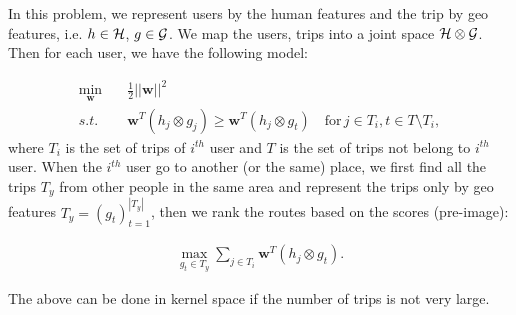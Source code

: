 \documentclass[a4paper,11pt]{article}
\begin{document}
In this problem, we represent users by the human features and the trip by geo features,
i.e. $h \in \cal{H}$, $g \in \cal{G}$. We map the users, trips into a joint space $\cal{H} \otimes
\cal{G}$. Then for each user, we have the following model:

\begin{align}
\min_{\mathbf{w}} &\quad \frac{1}{2} ||\mathbf{w}||^2 \nonumber \\
s.t. &\quad \mathbf{w}^T(h_j \otimes g_j)  \geq \mathbf{w}^T(h_j\otimes g_t) \quad \text{for}\, j \in T_i, t \in T \setminus T_i,
\end{align}
where $T_i$ is the set of trips of $i^{th}$ user and $T$ is the set of trips not belong to $i^{th}$ user. 
When the $i^{th}$ user go to another (or the same) place, we first find all the trips $T_y$ from other 
people in the same area and represent the trips only by geo features $T_y = (g_t)_{t=1}^{|T_y|}$, then 
we rank the routes based on the scores (pre-image):

\begin{align}
\max_{g_t\in T_y} \sum_{j\in T_i}\mathbf{w}^T(h_j\otimes g_t).
\end{align}

The above can be done in kernel space if the number of trips is not very large.



\end{document}
